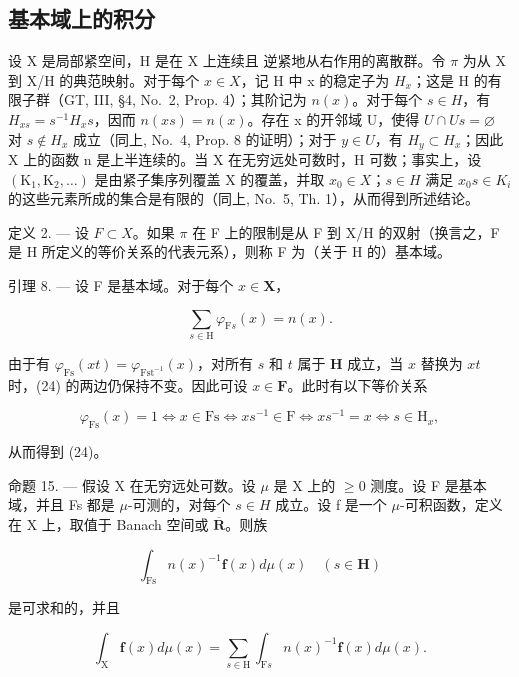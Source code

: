 \subsection{基本域上的积分}

设 X 是局部紧空间，H 是在 X 上连续且 逆紧地从右作用的离散群。令 \(\pi\) 为从 X 到 X/H 的典范映射。对于每个 \(x \in X\)，记 H 中 x 的稳定子为 \(H_x\)；这是 H 的有限子群（GT, III, §4, No.~2, Prop. 4）；其阶记为 \(n(x)\)。对于每个 \(s \in H\)，有 \(H_{xs} = s^{-1}H_x s\)，因而 \(n(xs) = n(x)\)。存在 x 的开邻域 U，使得 \(U \cap Us = \varnothing\) 对 \(s \notin H_x\) 成立（同上, No.~4, Prop. 8 的证明）；对于 \(y \in U\)，有 \(H_y \subset H_x\)；因此 X 上的函数 n 是上半连续的。当 X 在无穷远处可数时，H 可数；事实上，设 \((\mathrm{K}_1, \mathrm{K}_2, \ldots)\) 是由紧子集序列覆盖 X 的覆盖，并取 \(x_{0} \in X\)；\(s \in H\) 满足 \(x_{0}s \in K_{i}\) 的这些元素所成的集合是有限的（同上, No.~5, Th. 1），从而得到所述结论。

定义 2. --- 设 \(F \subset X\)。如果 \(\pi\) 在 F 上的限制是从 F 到 X/H 的双射（换言之，F 是 H 所定义的等价关系的代表元系），则称 F 为（关于 H 的）基本域。

引理 8. --- 设 F 是基本域。对于每个 \(x \in \mathbf{X}\)，

\[
\sum_ {s \in \mathrm{H}} \varphi_ {\mathrm{F} s} (x) = n (x).\tag{24}
\]

由于有 \(\varphi_{\mathrm{Fs}}(xt) = \varphi_{\mathrm{Fst}^{-1}}(x)\)，对所有 \(s\) 和 \(t\) 属于 \(\mathbf{H}\) 成立，当 \(x\) 替换为 \(xt\) 时，(24) 的两边仍保持不变。因此可设 \(x \in \mathbf{F}\)。此时有以下等价关系

\[
\varphi_ {\mathrm{Fs}} (x) = 1 \Leftrightarrow x \in \mathrm{Fs} \Leftrightarrow x s ^ {- 1} \in \mathrm{F} \Leftrightarrow x s ^ {- 1} = x \Leftrightarrow s \in \mathrm{H} _ {x},
\]

从而得到 (24)。

命题 15. --- 假设 X 在无穷远处可数。设 \(\mu\) 是 X 上的 \(\geqslant 0\) 测度。设 F 是基本域，并且 Fs 都是 \(\mu\)-可测的，对每个 \(s \in H\) 成立。设 f 是一个 \(\mu\)-可积函数，定义在 X 上，取值于 Banach 空间或 \(\overline{\mathbf{R}}\)。则族

\[
\int_ {\mathrm{Fs}} n (x) ^ {- 1} \mathbf {f} (x) d \mu (x) \quad (s \in \mathbf {H})
\]

是可求和的，并且

\[
\int_ {\mathrm{X}} \mathbf {f} (x) d \mu (x) = \sum_ {s \in \mathrm{H}} \int_ {\mathrm{F} s} n (x) ^ {- 1} \mathbf {f} (x) d \mu (x).
\]

